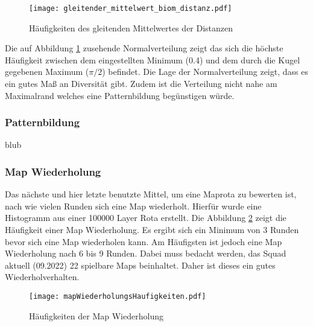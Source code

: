             \begin{figure}[htbp]
                \centering
                \texttt{[image: gleitender\_mittelwert\_biom\_distanz.pdf]}
                \caption{Häufigkeiten des gleitenden Mittelwertes der Distanzen}
                \label{fig:haufigkeit_gleitender_mittelwert}
            \end{figure}
            
            Die auf Abbildung \ref{fig:haufigkeit_gleitender_mittelwert} zusehende Normalverteilung zeigt das sich die höchste 
            Häufigkeit zwischen dem eingestellten Minimum (0.4) und dem durch die Kugel gegebenen Maximum ($\pi/2$) befindet.
            Die Lage der Normalverteilung zeigt, dass es ein gutes Maß an Diversität gibt. Zudem ist die
            Verteilung nicht nahe am Maximalrand welches eine Patternbildung begünstigen würde.


        \subsubsection{Patternbildung}
            blub 

        \subsubsection{Map Wiederholung}
            Das nächste und hier letzte benutzte Mittel, um eine Maprota zu bewerten ist, nach wie vielen Runden sich eine Map
            wiederholt. Hierfür wurde eine Histogramm aus einer 100000 Layer Rota erstellt.
            Die Abbildung \ref{fig:haufigkeit_der_map_wiederholung} zeigt die Häufigkeit einer Map Wiederholung. Es ergibt sich ein
            Minimum von 3 Runden bevor sich eine Map wiederholen kann. Am Häufigsten ist jedoch eine Map Wiederholung nach 6 bis 9 Runden.
            Dabei muss bedacht werden, das Squad aktuell (09.2022) 22 spielbare Maps beinhaltet. Daher ist dieses ein gutes Wiederholverhalten.

            \begin{figure}[htbp]
                \centering
                \texttt{[image: mapWiederholungsHaufigkeiten.pdf]}
                \caption{Häufigkeiten der Map Wiederholung}
                \label{fig:haufigkeit_der_map_wiederholung}
            \end{figure}

